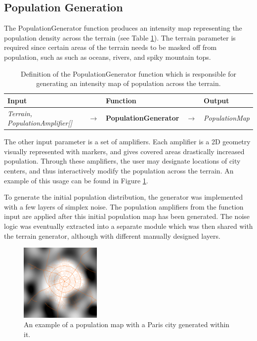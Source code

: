 \subsection{Population Generation}

The PopulationGenerator function produces an intensity map representing the population density across the terrain (see Table \ref{table:popgen}).
The terrain parameter is required since certain areas of the terrain needs to be masked off from population, such as such as oceans, rivers, and spiky mountain tops.
\begin{table}[H]
  \centering
  \begin{tabular}{lllll}
    \textbf{Input}                           &               & \textbf{Function}            &               & \textbf{Output}         \\
    \midrule
    \textit{Terrain, PopulationAmplifier[]}      & $\rightarrow$ & \textbf{PopulationGenerator}      & $\rightarrow$ & \textit{PopulationMap}        \\
    \bottomrule
  \end{tabular}

  \caption{Definition of the PopulationGenerator function which is responsible for generating an intensity map of population across the terrain.}
  \label{table:popgen}
\end{table}
\vspace{-0.4cm} %

The other input parameter is a set of amplifiers.
Each amplifier is a 2D geometry visually represented with markers, and gives covered areas drastically increased population.
Through these amplifiers, the user may designate locations of city centers, and thus interactively modify the population across the terrain.
An example of this usage can be found in Figure \ref{fig:pop_dens}.

To generate the initial population distribution, the generator was implemented with a few layers of simplex noise.
The population amplifiers from the function input are applied after this initial population map has been generated.
The noise logic was eventually extracted into a separate module which was then shared with the terrain generator, although with different manually designed layers.

\begin{figure}[h!]
  \centering
  \includegraphics[width=0.35\textwidth]{figure/pop_density.png}
  \caption{An example of a population map with a Paris city generated within it.}
  \label{fig:pop_dens}
\end{figure}